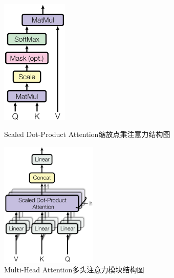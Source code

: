 \documentclass[serif]{beamer}
\begin{document}
  \begin{figure}[!htb]
   \begin{minipage}{0.48\textwidth}
     \centering
     \includegraphics[height=6cm]{Scaled_Dot-Product_Attention.png} %
     \caption{Scaled Dot-Product Attention缩放点乘注意力结构图}
     \label{Fig:Scaled_Dot-Product_Attention}
   \end{minipage}\hfill
   \begin {minipage}{0.48\textwidth}
     \centering
     \includegraphics[height=6cm]{Multi-Head_Attention.png} %
     \caption{Multi-Head Attention多头注意力模块结构图}
     \label{Fig:Multi-Head_Attention}
   \end{minipage}
\end{figure}
\end{document}
